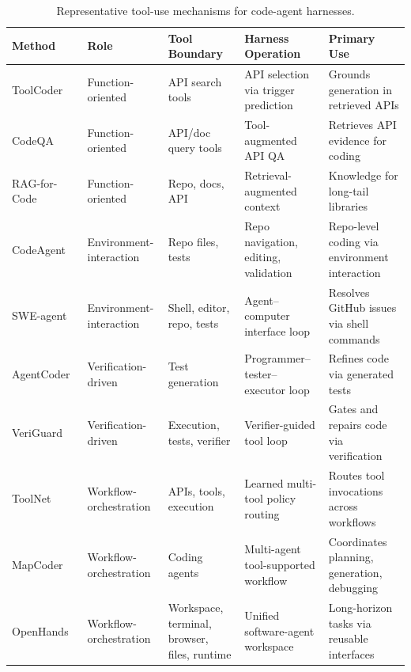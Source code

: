 \begin{table}[t]
\centering
\caption{Representative tool-use mechanisms for code-agent harnesses.}
\label{tab:tool_modules}
\renewcommand{\arraystretch}{1.12}
\setlength{\tabcolsep}{3pt}
\scriptsize
\begin{tabularx}{\textwidth}{@{}
  >{\raggedright\arraybackslash}p{2.6cm}
  >{\raggedright\arraybackslash}p{3.1cm}
  >{\raggedright\arraybackslash}p{3.0cm}
  >{\raggedright\arraybackslash}p{3.8cm}
  >{\raggedright\arraybackslash}X@{}}
\toprule
\textbf{Method} & \textbf{Role} & \textbf{Tool Boundary} & \textbf{Harness Operation} & \textbf{Primary Use} \\
\midrule
ToolCoder~\cite{zhang2023toolcoder}
& Function-oriented
& API search tools
& API selection via trigger prediction
& Grounds generation in retrieved APIs \\
CodeQA~\cite{ahmed2024codeqa}
& Function-oriented
& API/doc query tools
& Tool-augmented API QA
& Retrieves API evidence for coding \\
RAG-for-Code~\cite{zhao2025rag}
& Function-oriented
& Repo, docs, API
& Retrieval-augmented context
& Knowledge for long-tail libraries \\
\midrule
CodeAgent~\cite{zhang2024codeagent}
& Environment-interaction
& Repo files, tests
& Repo navigation, editing, validation
& Repo-level coding via environment interaction \\
SWE-agent~\cite{yang2024swe}
& Environment-interaction
& Shell, editor, repo, tests
& Agent--computer interface loop
& Resolves GitHub issues via shell commands \\
\midrule
AgentCoder~\cite{huang2023agentcoder}
& Verification-driven
& Test generation
& Programmer--tester--executor loop
& Refines code via generated tests \\
VeriGuard~\cite{miculicich2025veriguard}
& Verification-driven
& Execution, tests, verifier
& Verifier-guided tool loop
& Gates and repairs code via verification \\
\midrule
ToolNet~\cite{liu2024toolnet}
& Workflow-orchestration
& APIs, tools, execution
& Learned multi-tool policy routing
& Routes tool invocations across workflows \\
MapCoder~\cite{islam2024mapcoder}
& Workflow-orchestration
& Coding agents
& Multi-agent tool-supported workflow
& Coordinates planning, generation, debugging \\
OpenHands~\cite{wang2024openhands}
& Workflow-orchestration
& Workspace, terminal, browser, files, runtime
& Unified software-agent workspace
& Long-horizon tasks via reusable interfaces \\
\bottomrule
\end{tabularx}
\end{table}



